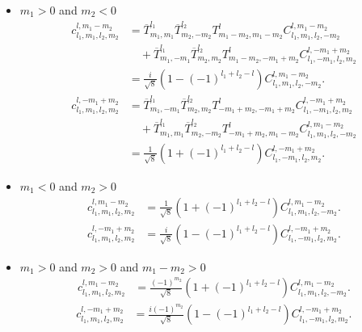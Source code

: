 \documentclass[onecolumn,11pt]{IEEEtran}
\begin{document}
\begin{itemize}
    \item $m_1 > 0$ and $m_2 < 0$
        \begin{align*}
            c^{l,m_1-m_2}_{l_1,m_1,l_2,m_2} & =  \overline T^{l_1}_{m_1,m_1} \overline T^{l_2}_{m_2,-m_2} T^l_{m_1-m_2,m_1-m_2} C^{l,m_1-m_2}_{l_1,m_1,l_2,-m_2}\\
                                            & \quad + \overline T^{l_1}_{m_1,-m_1} \overline T^{l_2}_{m_2,m_2} T^l_{m_1-m_2,-m_1+m_2} C^{l,-m_1+m_2}_{l_1,-m_1,l_2,m_2} \\
                                            & = \frac{i}{\sqrt{8}} ( 1 - (-1)^{l_1+l_2-l}) C^{l,m_1-m_2}_{l_1,m_1,l_2,-m_2}.
        \end{align*}
        \begin{align*}
            c^{l,-m_1+m_2}_{l_1,m_1,l_2,m_2} & = \overline T^{l_1}_{m_1,-m_1} \overline T^{l_2}_{m_2,m_2} T^l_{-m_1+m_2,-m_1+m_2} C^{l,-m_1+m_2}_{l_1,-m_1,l_2,m_2} \nonumber\\
                                             &\quad + \overline T^{l_1}_{m_1,m_1} \overline T^{l_2}_{m_2,-m_2} T^l_{-m_1+m_2,m_1-m_2} C^{l,m_1-m_2}_{l_1,m_1,l_2,-m_2} \\
                                             & =\frac{1}{\sqrt{8}} ( 1 + (-1)^{l_1+l_2-l}) C^{l,-m_1+m_2}_{l_1,-m_1,l_2,m_2}.
        \end{align*}

    \item $m_1 < 0$ and $m_2 > 0$
        \begin{align*}
            c^{l,m_1-m_2}_{l_1,m_1,l_2,m_2} & = \frac{1}{\sqrt{8}} ( 1 + (-1)^{l_1+l_2-l}) C^{l,m_1-m_2}_{l_1,m_1,l_2,-m_2}.
        \end{align*}
        \begin{align*}
            c^{l,-m_1+m_2}_{l_1,m_1,l_2,m_2} & = \frac{i}{\sqrt{8}} ( 1 - (-1)^{l_1+l_2-l}) C^{l,-m_1+m_2}_{l_1,-m_1,l_2,m_2}.
        \end{align*}

    \item $m_1 > 0$ and $m_2 > 0$ and $m_1-m_2 >0$
        \begin{align*}
            c^{l,m_1-m_2}_{l_1,m_1,l_2,m_2} & = \frac{(-1)^{m_2}}{\sqrt{8}} ( 1 + (-1)^{l_1+l_2-l}) C^{l,m_1-m_2}_{l_1,m_1,l_2,-m_2}.
        \end{align*}
        \begin{align*}
            c^{l,-m_1+m_2}_{l_1,m_1,l_2,m_2} & = \frac{i(-1)^{m_2}}{\sqrt{8}} ( 1 - (-1)^{l_1+l_2-l}) C^{l,-m_1+m_2}_{l_1,-m_1,l_2,m_2}.
        \end{align*}


\end{itemize}
\end{document}
